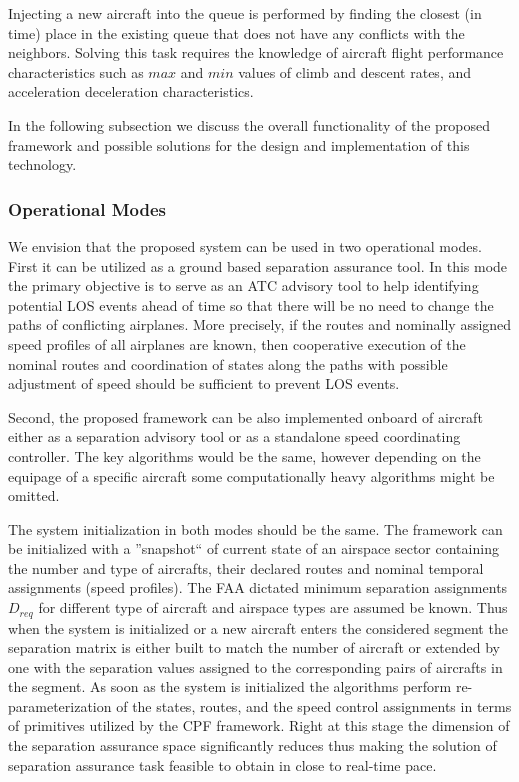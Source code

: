\documentclass[letter,onecolumn,12pt]{aiaa-tc}
\newcommand{\1}{1_n}
\begin{document}
\begin{itemize}
Injecting a new aircraft into the queue is performed by finding the closest (in time) place in the existing queue that does not have any conflicts with the neighbors. Solving this task requires the knowledge of aircraft flight performance characteristics such as $max$ and $min$ values of climb and descent rates, and acceleration deceleration characteristics.

\end{itemize}

In the  following subsection we discuss the overall functionality of the proposed framework and possible solutions for the design and implementation of this technology.

\subsubsection{Operational Modes}

We envision that the proposed system can be used in two operational modes. First it can be utilized as a ground based separation assurance tool. In this mode the primary objective is to serve as an ATC advisory tool to help identifying potential LOS events ahead of time so that there will be no need to change the paths of conflicting airplanes. More precisely, if the routes and nominally assigned speed profiles of all airplanes are known, then cooperative execution of the nominal routes and coordination of states along the paths with possible adjustment of speed should be sufficient to prevent LOS events.

Second, the proposed framework can be also implemented onboard of aircraft either as a separation advisory tool or as a standalone speed coordinating controller. The key algorithms would be the same, however depending on the equipage of a specific aircraft some computationally heavy algorithms might be omitted.

The system initialization in both modes should be the same. The framework can be initialized with a ''snapshot`` of current state of an airspace sector containing the number and type of aircrafts, their declared routes and nominal temporal assignments (speed profiles). The FAA dictated minimum separation assignments $D_{req}$ for different type of aircraft and airspace types are assumed be known. Thus when the system is initialized or a new aircraft enters the considered segment the separation matrix is either built to match the number of aircraft or extended by one with the  separation values assigned to the corresponding pairs of aircrafts in the segment. As soon as the system is initialized the algorithms perform re-parameterization of the states, routes, and the speed control assignments in terms of primitives utilized by the CPF framework. Right at this stage the dimension of the separation assurance space significantly reduces thus making the solution of separation assurance task feasible to obtain in close to real-time pace.
\end{document}
